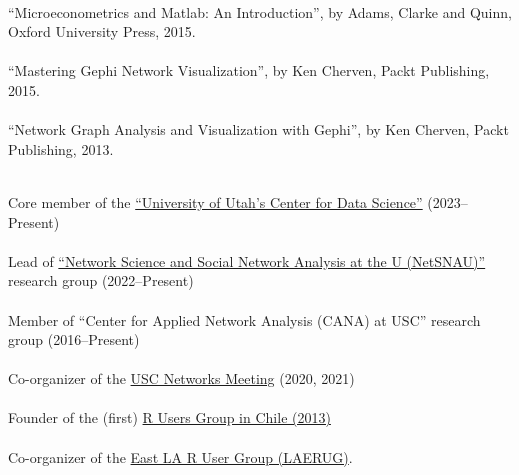 \documentclass[letterpaper, 10pt]{article}
\renewcommand{\textbf}[1]{{\bfseries\color{teal}#1}}
\begin{document}
\noindent\textbf{Book Review}\\

\noindent  ``Microeconometrics and Matlab: An Introduction'', by Adams, Clarke and Quinn, Oxford University Press, 2015.\\\\
``Mastering Gephi Network Visualization'', by Ken Cherven, Packt Publishing, 2015.\\\\
``Network Graph Analysis and Visualization with Gephi'', by Ken Cherven, Packt Publishing, 2013.\vspace{.5cm}

\noindent \textbf{Misc}\\

\noindent Core member of the \href{https://datascience.utah.edu}{``University of Utah's Center for Data Science''} (2023--Present)\\\\
%
Lead of \href{https://netsci.utah.edu}{``Network Science and Social Network Analysis at the U (NetSNAU)''} research group (2022--Present)\\\\
%
Member of ``Center for Applied Network Analysis (CANA) at USC'' research group (2016--Present) \\\\
%
Co-organizer of the \href{https://networkanalysis.usc.edu}{USC Networks Meeting} (2020, 2021)\\\\
%
Founder of the (first) \href{https://www.meetup.com/useRchile/}{R Users Group in Chile (2013)}\\\\
%
Co-organizer of the \href{https://socalr.org}{East LA R User Group (LAERUG)}.
\end{document}
